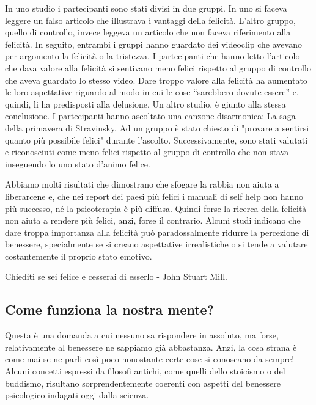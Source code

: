 \documentclass[12pt]{book} %
\begin{document}
In uno studio i partecipanti sono stati divisi in
due gruppi. In uno si faceva leggere un falso articolo che illustrava i vantaggi della felicità.
L'altro gruppo, quello di controllo, invece leggeva un articolo che non faceva riferimento alla
felicità. In seguito, entrambi i gruppi hanno guardato dei videoclip che avevano per argomento la felicità o la
tristezza. I partecipanti che hanno letto l'articolo che dava valore alla felicità si sentivano
meno felici rispetto al gruppo di controllo che aveva guardato lo stesso video. Dare troppo valore alla felicità ha
aumentato le loro aspettative riguardo al modo in cui le cose “sarebbero dovute essere” e, quindi, li ha predisposti
alla delusione. Un altro
studio, è giunto alla stessa conclusione. I partecipanti hanno ascoltato una canzone disarmonica: La saga della primavera di
Stravinsky. Ad un gruppo è stato chiesto di "provare a sentirsi quanto più possibile
felici" durante l'ascolto. Successivamente, sono stati valutati e
riconosciuti come meno felici rispetto al gruppo di controllo che non stava inseguendo lo uno stato
d'animo felice. 

Abbiamo molti risultati che dimostrano che sfogare la rabbia non aiuta a liberarcene e, che nei report dei paesi più felici i manuali di self help non hanno più successo,
né la psicoterapia è più diffusa. Quindi forse la ricerca della felicità non aiuta a rendere più felici, anzi, forse il
contrario. Alcuni studi indicano che dare troppa importanza alla felicità può paradossalmente ridurre la percezione di benessere, specialmente se si creano aspettative irrealistiche o si tende a valutare costantemente il proprio stato emotivo. 

Chiediti se sei felice e cesserai di esserlo - John Stuart Mill.

\subsection{Come funziona la nostra mente?}
Questa è una domanda a cui nessuno sa rispondere in assoluto, ma forse, relativamente al benessere ne sappiamo già
abbastanza. Anzi, la cosa strana è come mai se ne parli così poco nonostante certe cose si conoscano da sempre! Alcuni concetti espressi da filosofi antichi, come quelli dello stoicismo o del buddismo, risultano sorprendentemente coerenti con aspetti del benessere psicologico indagati oggi dalla scienza.
\end{document}
